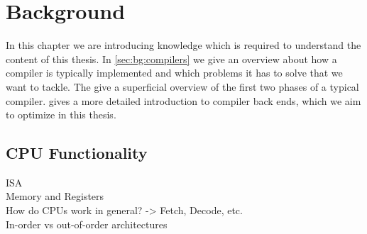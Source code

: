 \chapter{Background}
In this chapter we are introducing knowledge which is required to understand the content of this thesis.
In \cref{sec:bg:compilers} we give an overview about how a compiler is typically implemented and which problems it has to solve that we want to tackle.
The  give a superficial overview of the first two phases of a typical compiler.
 gives a more detailed introduction to compiler back ends, which we aim to optimize in this thesis.


\section{CPU Functionality}
\label{sec:bg:cpu}
ISA\\
Memory and Registers\\
How do CPUs work in general? -> Fetch, Decode, etc.\\
In-order vs out-of-order architectures

